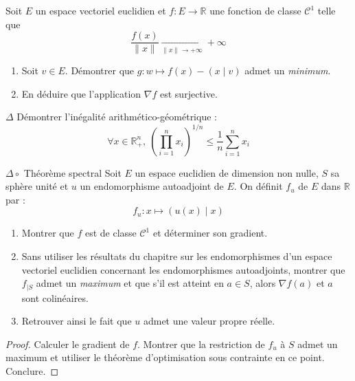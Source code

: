 \documentclass[french,a4paper]{article}
\newcommand{\R}{\mathbb{R}}
\theoremstyle{plain}
\theoremstyle{definition}
\theoremstyle{remark}
\begin{document}
\begin{ex}[Moulin.CD.51]{}
	Soit $E$ un espace vectoriel euclidien et $f:E\to\R$ une fonction de classe $\mathcal{C}^1$ telle que $$\frac{f(x)}{\lVert x\rVert}\xrightarrow[\lVert x\rVert\to+\infty]{}+\infty$$
	\begin{enumerate}
		\item Soit $v\in E$. Démontrer que $g:w\mapsto f(x)-(x\mid v)$ admet un \textit{minimum}.
		\item En déduire que l'application $\nabla f$ est surjective.
	\end{enumerate}
\end{ex}

\begin{ex}[Moulin.CD.51]{$\Delta$}
	Démontrer l'inégalité arithmético-géométrique : $$\forall x\in\R_+^n,\ \left(\prod_{i=1}^{n}x_i\right)^{1/n}\leqslant\frac{1}{n}\sum_{i=1}^{n}x_i$$
\end{ex}

\begin{ex}[Moulin.CD.53]{$\Delta\circ$ Théorème spectral}
	Soit $E$ un espace euclidien de dimension non nulle, $S$ sa sphère unité et $u$ un endomorphisme autoadjoint de $E$. On définit $f_u$ de $E$ dans $\R$ par : $$f_u:x\mapsto (u(x)\mid x)$$
	\begin{enumerate}
		\item Montrer que $f$ est de classe $\mathcal{C}^1$ et déterminer son gradient.
		\item Sans utiliser les résultats du chapitre sur les endomorphismes d'un espace vectoriel euclidien concernant les endomorphismes autoadjoints, montrer que $f_{\mid S}$ admet un \textit{maximum} et que s'il est atteint en $a\in S$, alors $\nabla f(a)$ et $a$ sont colinéaires.
		\item Retrouver ainsi le fait que $u$ admet une valeur propre réelle.
	\end{enumerate}
\end{ex}
\begin{proof}
	Calculer le gradient de $f$. Montrer que la restriction de $f_u$ à $S$ admet un maximum et utiliser le théorème d'optimisation sous contrainte en ce point. Conclure. 
\end{proof}
\end{document}
